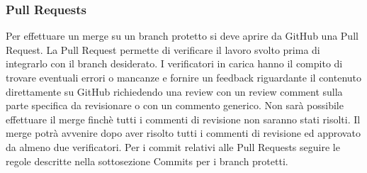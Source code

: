 \subsubsection{Pull Requests}
Per effettuare un merge su un branch protetto si deve aprire da GitHub una Pull Request.
La Pull Request permette di verificare il lavoro svolto prima di integrarlo con il branch desiderato.
I verificatori in carica hanno il compito di trovare eventuali errori o mancanze e fornire un feedback riguardante il contenuto direttamente su GitHub richiedendo
una review con un review comment sulla parte specifica da revisionare o con un commento generico.
Non sarà possibile effettuare il merge finchè tutti i commenti di revisione non saranno stati risolti.
Il merge potrà avvenire dopo aver risolto tutti i commenti di revisione ed approvato da almeno due verificatori.
Per i commit relativi alle Pull Requests seguire le regole descritte nella sottosezione Commits per i branch protetti.



